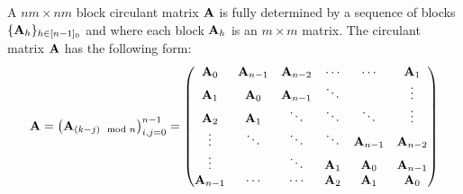 A $nm\times nm$ block circulant matrix $\mathbf{A}$ is fully determined by a sequence of blocks $\{\mathbf{A}_h\}_{h \in [n-1]_0}$ and where each block $\mathbf{A}_h$ is an $m \times m$ matrix.
The circulant matrix $\mathbf{A}$ has the following form:
\begin{equation}
  \Amat = \leftmat \Amat_{(k-j) \mod n} \rightmat_{i, j = 0}^{n-1} = 
  \leftmatrix
    \Amat_{0}   & \Amat_{n-1} & \Amat_{n-2} & \cdots    & \cdots      & \Amat_{1}   \\
    \Amat_{1}   & \Amat_{0}   & \Amat_{n-1} & \ddots    &             & \vdots      \\
    \Amat_{2}   & \Amat_{1}   & \ddots      & \ddots    & \ddots      & \vdots      \\ 
    \vdots      & \ddots      & \ddots      & \ddots    & \Amat_{n-1} & \Amat_{n-2} \\
    \vdots      &             & \ddots      & \Amat_{1} & \Amat_{0}   & \Amat_{n-1} \\
    \Amat_{n-1} & \cdots      & \cdots      & \Amat_{2} & \Amat_{1}   & \Amat_{0}
  \rightmatrix
\end{equation}


